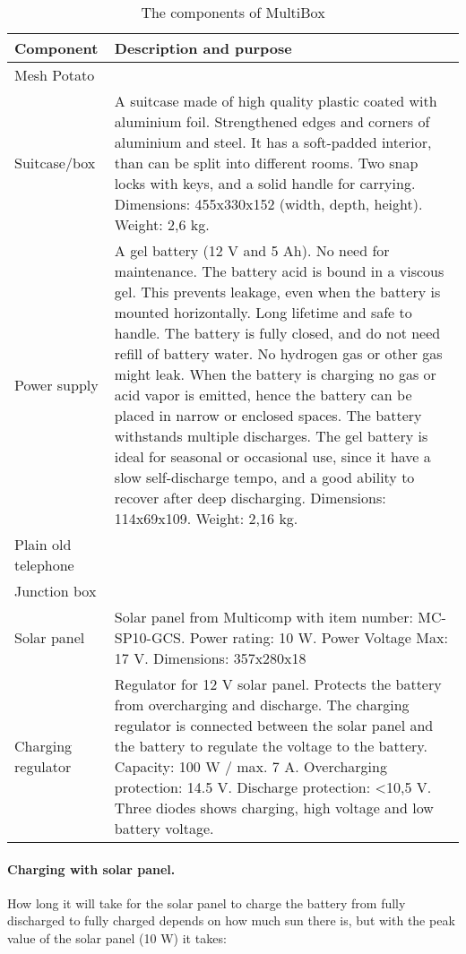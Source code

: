 \begin{center}
\begin{table}[!hb]
\caption{\label{tab:components}The components of MultiBox}
    \begin{tabular}{ | l | p{9cm} |}
    \hline
    \textbf{Component} & \textbf{Description and purpose} \\ 
    \hline
    Mesh Potato &  \\ 
    \hline
    Suitcase/box &  A suitcase made of high quality plastic coated with aluminium foil. Strengthened edges and corners of aluminium and steel. It has a soft-padded interior, than can be split into different rooms. Two snap locks with keys, and a solid handle for carrying. Dimensions: 455x330x152 (width, depth, height). Weight: 2,6 kg. \\ 
    \hline
    Power supply & A gel battery (12 V and 5 Ah). No need for maintenance. The battery acid is bound in a viscous gel. This prevents leakage, even when the battery is mounted horizontally. Long lifetime and safe to handle. The battery is fully closed, and do not need refill of battery water. No hydrogen gas or other gas might leak. When the battery is charging no gas or acid vapor is emitted, hence the battery can be placed in narrow or enclosed spaces. The battery withstands multiple discharges. The gel battery is ideal for seasonal or occasional use, since it have a slow self-discharge tempo, and a good ability to recover after deep discharging. Dimensions: 114x69x109. Weight: 2,16 kg. \\
    \hline
    Plain old telephone & \\
	\hline
	Junction box & \\
	\hline
	Solar panel & Solar panel from Multicomp with item number: MC-SP10-GCS. Power rating: 10 W. Power Voltage Max: 17 V. Dimensions: 357x280x18\\
	\hline
	Charging regulator & Regulator for 12 V solar panel. Protects the battery from overcharging and discharge. The charging regulator is connected between the solar panel and the battery to regulate the voltage to the battery. Capacity: 100 W / max. 7 A. Overcharging protection: 14.5 V. Discharge protection: <10,5 V. Three diodes shows charging, high voltage and low battery voltage. \\
	\hline
    \end{tabular}
   \end{table}
\end{center}

\paragraph{Charging with solar panel.}
How long it will take for the solar panel to charge the battery from fully discharged to fully charged depends on how much sun there is, but with the peak value of the solar panel (10 W) it takes: 

